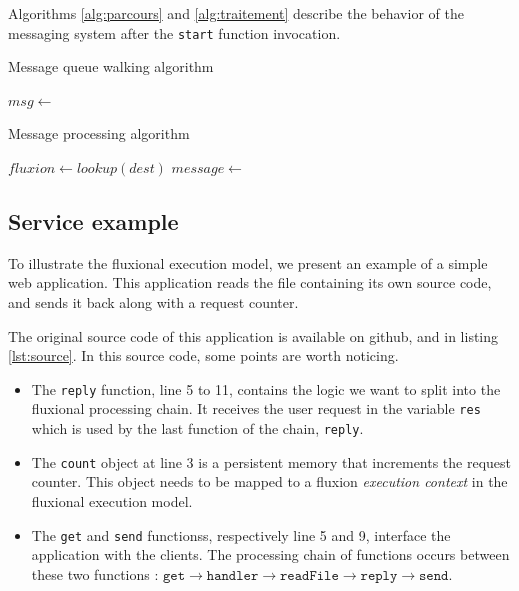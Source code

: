 Algorithms \ref{alg:parcours} and \ref{alg:traitement} describe the behavior of the messaging system after the \texttt{start} function invocation.

\begin{algorithm}
\caption{Message queue walking algorithm}
\label{alg:parcours}
\begin{algorithmic}
\State $msg \gets$  
\State {}
\EndWhile
\EndFunction
\end{algorithmic}
\end{algorithm}

\begin{algorithm}
\caption{Message processing algorithm}
\label{alg:traitement}
\begin{algorithmic}
\State $fluxion \gets lookup(dest)$
\State $message \gets$  
\State {} 
\EndFor
\EndFunction
\end{algorithmic}
\end{algorithm}

\subsection{Service example}

To illustrate the fluxional execution model, we present an example of a simple web application.
This application reads the file containing its own source code, and sends it back along with a request counter.

The original source code of this application is available on github\cite{flx-example}, and in listing \ref{lst:source}.
In this source code, some points are worth noticing.

\begin{itemize}
  \item The \texttt{reply} function, line 5 to 11, contains the logic we want to split into the fluxional processing chain.
  It receives the user request in the variable \texttt{res} which is used by the last function of the chain, \texttt{reply}.
  \item The \texttt{count} object at line 3 is a persistent memory that increments the request counter.
  This object needs to be mapped to a fluxion \textit{execution context} in the fluxional execution model.
  \item The \texttt{get} and \texttt{send} functionss, respectively line 5 and 9, interface the application with the clients.
  The processing chain of functions occurs between these two functions : $\texttt{get} \to \texttt{handler} \to \texttt{readFile} \to \texttt{reply} \to \texttt{send}$.
\end{itemize}

